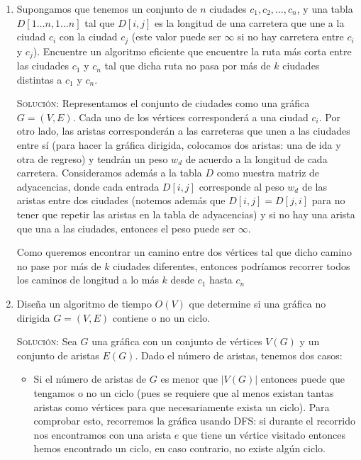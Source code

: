 \documentclass[letterpaper,11pt]{article}
\begin{document}
\begin{enumerate}
    \item Supongamos que tenemos un conjunto de $n$ ciudades $c_1, c_2, \ldots,
    c_n$, y una tabla $D[1 \ldots n, 1 \ldots n]$ tal que $D[i,j]$ es la longitud 
    de una carretera que une a la ciudad $c_i$ con la ciudad $c_j$ (este valor 
    puede ser $\infty$ si no hay carretera entre $c_i$ y $c_j$). Encuentre un 
    algoritmo eficiente que encuentre la ruta más corta entre las ciudades $c_1$
    y $c_n$ tal que dicha ruta no pasa por más de $k$ ciudades distintas a 
    $c_1$ y $c_n$.

    \textsc{Solución:} Representamos el conjunto de ciudades como una gráfica
    $G = (V, E)$. Cada uno de los vértices corresponderá a una ciudad $c_i$. 
    Por otro lado, las aristas corresponderán a las carreteras que unen a las 
    ciudades entre sí (para hacer la gráfica dirigida, colocamos dos aristas: 
    una de ida y otra de regreso) y tendrán un peso $w_d$ de acuerdo a la 
    longitud de cada carretera. Consideramos además a la tabla $D$ como 
    nuestra matriz de adyacencias, donde cada entrada $D[i,j]$ corresponde al 
    peso $w_d$ de las aristas entre dos ciudades (notemos además que $D[i,j] = 
    D[j, i]$ para no tener que repetir las aristas en la tabla de adyacencias)
    y si no hay una arista que una a las ciudades, entonces el peso puede ser 
    $\infty$.

    Como queremos encontrar un camino entre dos vértices tal que dicho camino 
    no pase por más de $k$ ciudades diferentes, entonces podríamos recorrer 
    todos los caminos de longitud a lo más $k$ desde $c_1$ hasta $c_n$

    \item Diseña un algoritmo de tiempo $O(V)$ que determine si una gráfica no
    dirigida $G = (V, E)$ contiene o no un ciclo.

    \textsc{Solución:} Sea $G$ una gráfica con un conjunto de vértices $V(G)$ y 
    un conjunto de aristas $E(G)$. Dado el número de aristas, tenemos dos casos:
    \begin{itemize}
        \item Si el número de aristas de $G$ es menor que $|V(G)|$ entonces puede 
        que tengamos o no un ciclo (pues se requiere que al menos existan tantas
        aristas como vértices para que necesariamente exista un ciclo). Para 
        comprobar esto, recorremos la gráfica usando DFS: si durante el recorrido
        nos encontramos con una arista $e$ que tiene un vértice visitado entonces
        hemos encontrado un ciclo, en caso contrario, no existe algún ciclo. 


\end{itemize}
\end{enumerate}
\end{document}

